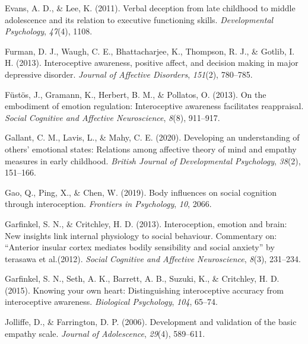 \documentclass[
  man,mask,floatsintext]{apa6}
\newlength{\cslhangindent}
\newlength{\cslentryspacingunit} %
\newenvironment{CSLReferences}[2] %
 {%
  \setlength{\parindent}{0pt}
  \ifodd #1
  \let\oldpar\par
  \def\par{\hangindent=\cslhangindent\oldpar}
  \fi
  \setlength{\parskip}{#2\cslentryspacingunit}
 }%
 {}
\begin{document}
\begin{CSLReferences}{1}{0}
\leavevmode{}%
Evans, A. D., \& Lee, K. (2011). Verbal deception from late childhood to middle adolescence and its relation to executive functioning skills. \emph{Developmental Psychology}, \emph{47}(4), 1108.

\leavevmode{}%
Furman, D. J., Waugh, C. E., Bhattacharjee, K., Thompson, R. J., \& Gotlib, I. H. (2013). Interoceptive awareness, positive affect, and decision making in major depressive disorder. \emph{Journal of Affective Disorders}, \emph{151}(2), 780--785.

\leavevmode{}%
Füstös, J., Gramann, K., Herbert, B. M., \& Pollatos, O. (2013). On the embodiment of emotion regulation: Interoceptive awareness facilitates reappraisal. \emph{Social Cognitive and Affective Neuroscience}, \emph{8}(8), 911--917.

\leavevmode{}%
Gallant, C. M., Lavis, L., \& Mahy, C. E. (2020). Developing an understanding of others' emotional states: Relations among affective theory of mind and empathy measures in early childhood. \emph{British Journal of Developmental Psychology}, \emph{38}(2), 151--166.

\leavevmode{}%
Gao, Q., Ping, X., \& Chen, W. (2019). Body influences on social cognition through interoception. \emph{Frontiers in Psychology}, \emph{10}, 2066.

\leavevmode{}%
Garfinkel, S. N., \& Critchley, H. D. (2013). Interoception, emotion and brain: New insights link internal physiology to social behaviour. Commentary on: {``Anterior insular cortex mediates bodily sensibility and social anxiety''} by terasawa et al.(2012). \emph{Social Cognitive and Affective Neuroscience}, \emph{8}(3), 231--234.

\leavevmode{}%
Garfinkel, S. N., Seth, A. K., Barrett, A. B., Suzuki, K., \& Critchley, H. D. (2015). Knowing your own heart: Distinguishing interoceptive accuracy from interoceptive awareness. \emph{Biological Psychology}, \emph{104}, 65--74.

\leavevmode{}%
Jolliffe, D., \& Farrington, D. P. (2006). Development and validation of the basic empathy scale. \emph{Journal of Adolescence}, \emph{29}(4), 589--611.


\end{CSLReferences}
\end{document}
